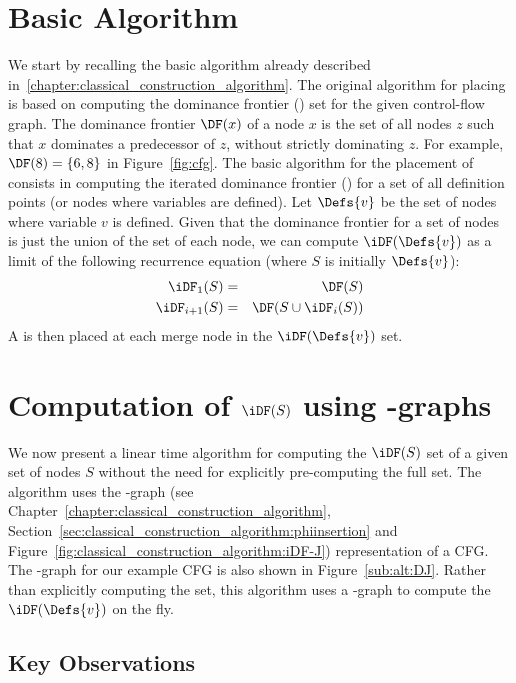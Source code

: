 {\section{Basic Algorithm} \label{section:alternative_ssa_construction_algorithms:cytron}
We start by recalling the basic algorithm already described in~\ref{chapter:classical_construction_algorithm}. 
The original algorithm for placing \phifuns is based on computing the dominance frontier (\DF) set for the given control-flow graph. 
The dominance frontier $\DF(x)$ of a node $x$ is the set of all nodes $z$ such that $x$ dominates a predecessor of $z$, without strictly dominating $z$. 
For example, $\DF(8)= \{ 6, 8 \}$ in Figure~\ref{fig:cfg}. 
The basic algorithm for the placement of \phifuns consists in computing the iterated dominance frontier (\iDF) for a set of all definition points (or nodes where variables are defined). 
Let $\Defs{v}$ be the set of nodes where variable $v$ is defined. 
Given that the dominance frontier for a set of nodes is just the union of the \DF set of each node, we can compute $\iDF(\Defs{v})$ as a limit of the following recurrence equation (where $S$ is initially $\Defs{v}$): \begin{eqnarray*} \iDF_1(S) &=& \DF(S) \\ \iDF_{i+1} (S) &=& \DF(S \cup \iDF_i(S))  \end{eqnarray*}
A \phifun is then placed at each merge node in the  $\iDF(\Defs{v})$ set. 

\section{Computation of $\iDF(S)$ using \DJ-graphs}
\label{section:alternative_ssa_construction_algorithms:sreedhar}
We now present a linear time algorithm for computing the $\iDF(S)$ set of a given set of nodes $S$ without the need for explicitly pre-computing the full \DF set. 
The algorithm uses the \DJ-graph (see Chapter~\ref{chapter:classical_construction_algorithm}, Section~\ref{sec:classical_construction_algorithm:phiinsertion} and Figure~\ref{fig:classical_construction_algorithm:iDF-J}) representation of a CFG. 
The \DJ-graph for our example CFG is also shown in Figure~\ref{sub:alt:DJ}. 
Rather than explicitly computing the \DF set, this algorithm uses a \DJ-graph to compute the $\iDF(\Defs{v})$ on the fly.

\subsection{Key Observations} 
 
}
